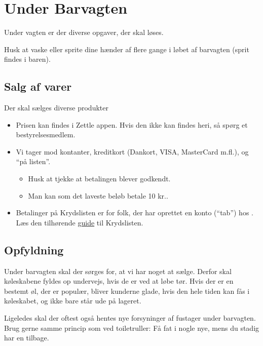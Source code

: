 \section{Under Barvagten}
\label{sec:intra-barvagten}

Under vagten er der diverse opgaver, der skal løses.

Husk at vaske eller sprite dine hænder af flere gange i løbet af barvagten (sprit findes i baren).

\subsection{Salg af varer}
\label{sec:intra:salg}

Der skal sælges diverse produkter
\begin{itemize}
    \item Prisen kan findes i Zettle appen. Hvis den ikke kan findes heri, så spørg et bestyrelsesmedlem.
    \item Vi tager mod kontanter, kreditkort (Dankort, VISA, MasterCard
    m.fl.), og ``på listen''.
    \begin{itemize}
        \item Husk at tjekke at betalingen blever godkendt.
        \item Man kan som det laveste beløb betale 10 kr..
    \end{itemize}
    \item Betalinger på Krydslisten er for folk, der har oprettet en konto
    (``tab'') hos \fredagscafeen. Læs den tilhørende \href{https://media.fredagscafeen.dk/guides/krydsliste.pdf}{guide} til Krydslisten.
\end{itemize}

\subsection{Opfyldning}
\label{sec:intra:opfyldning}

Under barvagten skal der sørges for, at vi har noget at sælge. Derfor skal
køleskabene fyldes op undervejs, hvis de er ved at løbe tør. Hvis der
er en bestemt øl, der er populær, bliver kunderne glade, hvis den hele
tiden kan fås i køleskabet, og ikke bare står ude på lageret.

Ligeledes skal der oftest også hentes nye forsyninger af fustager
under barvagten. Brug gerne samme princip som ved toiletruller: Få fat
i nogle nye, mens du stadig har en tilbage.


